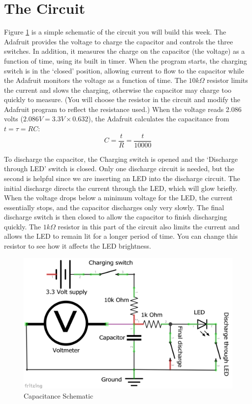 \documentclass[]{article}
\begin{document}
\section{The Circuit}

Figure \ref{cap} is a simple schematic of the circuit you will build this week.  The Adafruit provides the voltage to charge the capacitor and controls the three switches.  In addition, it measures the charge on the capacitor (the voltage) as a function of time, using its built in timer.  When the program starts, the charging switch is in the `closed' position, allowing current to flow to the capacitor while the Adafruit monitors the voltage as a function of time.  The $10k \Omega$ resistor limits the current and slows the charging, otherwise the capacitor may charge too quickly to measure. (You will choose the resistor in the circuit and modify the Adafruit program to reflect the resistance used.) When the voltage reads 2.086 volts ($2.086 V = 3.3 V \times 0.632$), the Adafruit calculates the capacitance from $t=\tau=RC$: 
\begin{equation*}
C=\frac{t}{R}=\frac{t}{10000} 
\end{equation*}

To discharge the capacitor, the Charging switch is opened and the `Discharge through LED' switch is closed.  Only one discharge circuit is needed, but the second is helpful since we are inserting an LED into the  discharge circuit.  The initial discharge directs the current through the LED, which will glow briefly.  When the voltage drops below a minimum voltage for the LED, the current essentially stops, and the capacitor discharges only very slowly.  The final discharge switch is then closed to allow the capacitor to finish discharging quickly.  The $1k \Omega$ resistor in this part of the circuit also limits the current and  allows the LED to remain lit for a longer period of time.  You can change this resistor to see how it affects the LED brightness.



\begin{figure}[h]
	\centering
	\includegraphics[width=12cm]{pics/Metro Schematic.png}
	\caption{Capacitance Schematic}
	\label{cap}
\end{figure}
\end{document}
